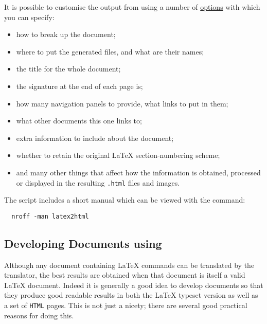 \medskip
{}\html{\\}\noindent
It is possible to customise the output from \latextohtml{} using a number of
\hyperref{command-line options}{command-line options (see Section~}{)}{options}
with which you can specify:
\begin{itemize}
\item
how to break up the document;
\item
where to put the generated files, and what are their names;
\item
the title for the whole document;
\item
the signature at the end of each page is;
\item
how many navigation panels to provide, what links to put in them;
\item
what other documents this one links to;
\item
extra information to include about the document;
\item
whether to retain the original \LaTeX{} section-numbering scheme;
\item
and many other things that affect how the information is obtained,
processed or displayed in the resulting \texttt{.html} files and images.
\end{itemize}

\medskip
{}\html{\\}\noindent
The \latextohtml{} script includes a short manual
which can be viewed with the command:
\begin{verbatim}
  nroff -man latex2html
\end{verbatim}


\subsection{Developing Documents using \latextohtml{}\label{devel}}
%
Although any document containing \LaTeX{} commands can be translated
by the \latextohtml{} translator, the best results are obtained when
that document is itself a valid \LaTeX{} document.
Indeed it is generally a good idea to develop documents so that
they produce good readable results in both the \LaTeX{} typeset
version as well as a set of \texttt{HTML} pages.
This is not just a nicety;
there are several good practical reasons for doing this.

